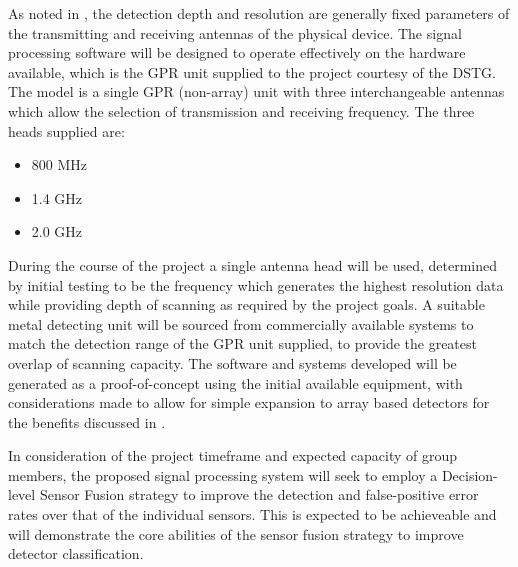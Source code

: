 \documentclass[main.tex]{subfiles}
\begin{document}
As noted in , the detection depth and resolution are generally fixed parameters of the transmitting and receiving antennas of the physical device. The signal processing software will be designed to operate effectively on the hardware available, which is the GPR unit supplied to the project courtesy of the DSTG. The model is a single GPR (non-array) unit with three interchangeable antennas which allow the selection of transmission and receiving frequency. The three heads supplied are:
\begin{itemize}
\item 800 MHz
\item 1.4 GHz
\item 2.0 GHz
\end{itemize}
During the course of the project a single antenna head will be used, determined by initial testing to be the frequency which generates the highest resolution data while providing depth of scanning as required by the project goals. A suitable metal detecting unit will be sourced from commercially available systems to match the detection range of the GPR unit supplied, to provide the greatest overlap of scanning capacity.
The software and systems developed will be generated as a proof-of-concept using the initial available equipment, with considerations made to allow for simple expansion to array based detectors for the benefits discussed in . 

In consideration of the project timeframe and expected capacity of group members, the proposed signal processing system will seek to employ a Decision-level Sensor Fusion strategy to improve the detection and false-positive error rates over that of the individual sensors. This is expected to be achieveable and will demonstrate the core abilities of the sensor fusion strategy to improve detector classification. \\
\end{document}
